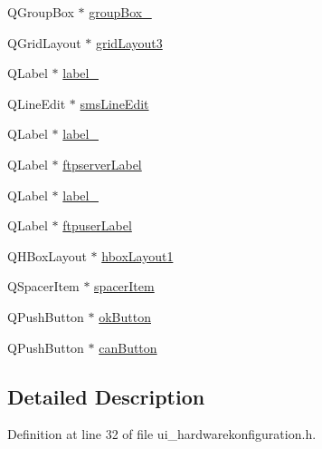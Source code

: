 \begin{CompactItemize}
\item 
QGroupBox $\ast$ \hyperlink{class_ui___hardware_konfiguration_class_4d695d720fa8e0628352988ce0444032}{groupBox\_}
\item 
QGridLayout $\ast$ \hyperlink{class_ui___hardware_konfiguration_class_616060ede50422ca3ac6f840ddf04d92}{gridLayout3}
\item 
QLabel $\ast$ \hyperlink{class_ui___hardware_konfiguration_class_348aba125d7ff32a3150296a76abaf80}{label\_}
\item 
QLineEdit $\ast$ \hyperlink{class_ui___hardware_konfiguration_class_fc72e5b8861519cde9f6239f17cccb61}{smsLineEdit}
\item 
QLabel $\ast$ \hyperlink{class_ui___hardware_konfiguration_class_64d33b6f74e3d7e079f5816ae8a2ff3a}{label\_}
\item 
QLabel $\ast$ \hyperlink{class_ui___hardware_konfiguration_class_7865898e0d9de7ebfa36092553af4933}{ftpserverLabel}
\item 
QLabel $\ast$ \hyperlink{class_ui___hardware_konfiguration_class_390d02b0b494e0a143923718a249337a}{label\_}
\item 
QLabel $\ast$ \hyperlink{class_ui___hardware_konfiguration_class_5ef17f240862378780e2861793858416}{ftpuserLabel}
\item 
QHBoxLayout $\ast$ \hyperlink{class_ui___hardware_konfiguration_class_be7ab9d49b40006d2e135e1b817d148a}{hboxLayout1}
\item 
QSpacerItem $\ast$ \hyperlink{class_ui___hardware_konfiguration_class_b880d2dd22ebd6eb91a4ea2781c9c7c8}{spacerItem}
\item 
QPushButton $\ast$ \hyperlink{class_ui___hardware_konfiguration_class_cabb4bbcd486c32f91ece5002edbe4be}{okButton}
\item 
QPushButton $\ast$ \hyperlink{class_ui___hardware_konfiguration_class_9026a8094d9334f126b00375fa27067c}{canButton}
\end{CompactItemize}


\subsection{Detailed Description}


Definition at line 32 of file ui\_\-hardwarekonfiguration.h.

